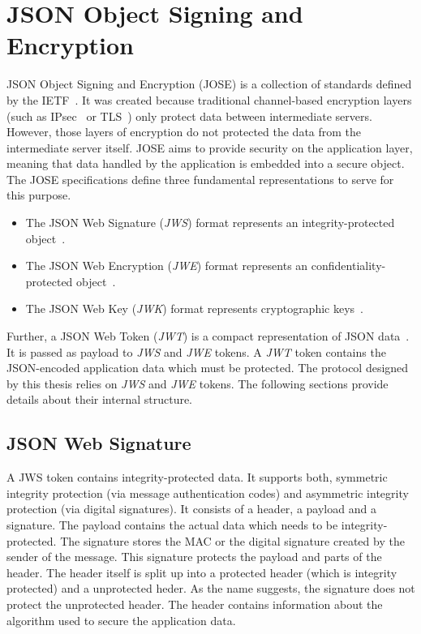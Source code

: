 \documentclass[../main.tex]{subfiles}
\begin{document}
\section{JSON Object Signing and Encryption}
JSON Object Signing and Encryption (JOSE) is a collection of standards defined by the IETF~\cite{Barnes2014}.
It was created because traditional channel-based encryption layers (such as IPsec~\cite{IPSEC2011} or TLS~\cite{TLS2018}) only protect data between intermediate servers.
However, those layers of encryption do not protected the data from the intermediate server itself.
JOSE aims to provide security on the application layer, meaning that data handled by the application is embedded into a secure object.
The JOSE specifications define three fundamental representations to serve for this purpose.~\cite{Barnes2014}
\begin{itemize}
    \item The JSON Web Signature (\emph{JWS}) format represents an integrity-protected object~\cite{JWS2015}.
    \item The JSON Web Encryption (\emph{JWE}) format represents an confidentiality-protected object~\cite{JWE2015}.
    \item The JSON Web Key (\emph{JWK}) format represents cryptographic keys~\cite{JWK2015}.
\end{itemize}
Further, a JSON Web Token (\emph{JWT}) is a compact representation of JSON data~\cite{JWT2015}.
It is passed as payload to \emph{JWS} and \emph{JWE} tokens.
A \emph{JWT} token contains the JSON-encoded application data which must be protected.
The protocol designed by this thesis relies on \emph{JWS} and \emph{JWE} tokens.
The following sections provide details about their internal structure.

\subsection{JSON Web Signature}
A JWS token contains integrity-protected data.
It supports both, symmetric integrity protection (via message authentication codes) and asymmetric integrity protection (via digital signatures).
It consists of a header, a payload and a signature.
The payload contains the actual data which needs to be integrity-protected.
The signature stores the MAC or the digital signature created by the sender of the message.
This signature protects the payload and parts of the header.
The header itself is split up into a protected header (which is integrity protected) and a unprotected heder.
As the name suggests, the signature does not protect the unprotected header.
The header contains information about the algorithm used to secure the application data.~\cite{JWS2015}
\end{document}
